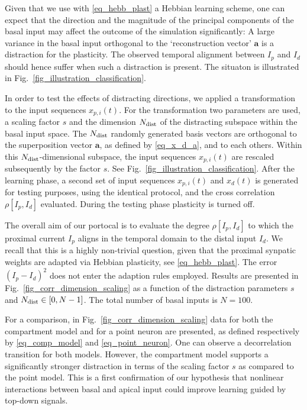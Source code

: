 \documentclass[utf8]{frontiersSCNS} %
\begin{document}
Given that we use with \eqref{eq_hebb_plast}
a Hebbian learning scheme, one can expect that
the direction and the magnitude of the principal 
components of the basal input may affect the
outcome of the simulation significantly:
A large variance in the basal input 
orthogonal to the `reconstruction vector' $\mathbf{a}$ 
is a distraction for the plasticity. The
observed temporal alignment between $I_p$ and 
$I_d$ should hence suffer when such a 
distraction is present. The situaton is illustrated 
in Fig.~\ref{fig_illustration_classification}.

In order to test the effects of distracting directions,
we applied a transformation to the input sequences $x_{p,i}(t)$.
For the transformation two parameters are used,
a scaling factor $s$ and the dimension $N_{\rm dist}$ 
of the distracting subspace within the basal input 
space. The $N_{\rm dist}$ randomly generated
basis vectors are orthogonal to the superposition
vector $\mathbf{a}$, as defined by \eqref{eq_x_d_a},
and to each others. Within this $N_{\rm dist}$-dimensional 
subspace, the input sequences $x_{p,i}(t)$ are
rescaled subsequently by the factor $s$. 
See Fig.~\ref{fig_illustration_classification}.
After the learning phase, a second set of input 
sequences $x_{p,i}(t)$ and $x_d(t)$ is generated for 
testing purposes, using the identical protocol, and
the cross correlation $\rho[I_p,I_d]$ 
evaluated. During the testing phase plasticity is 
turned off.

The overall aim of our portocal is to evaluate
the degree $\rho[I_p,I_d]$ to which
the proximal current $I_p$ aligns in the
temporal domain to the distal input $I_d$.
We recall that this is a highly non-trivial
question, given that the proximal synpatic
weights are adapted via Hebbian plasticity, 
see \eqref{eq_hebb_plast}. The error 
$(I_p-I_d)^2$ does not
enter the adaption rules employed.
Results are presented in
Fig.~\ref{fig_corr_dimension_scaling}
as a function of the distraction parameters 
$s$ and $N_{\rm dist}\in[0,N-1]$. The
total number of basal inputs is $N=100$.

For a comparison, in 
Fig.~\ref{fig_corr_dimension_scaling}
data for both the compartment model
and for a point neuron are presented,
as defined respectively by
\eqref{eq_comp_model}
and \eqref{eq_point_neuron}.
One can observe a decorrelation transition for 
both models. However, the compartment model supports a 
significantly stronger distraction in terms of the scaling 
factor $s$ as compared to the point model. This is a first confirmation 
of our hypothesis that nonlinear interactions between basal and 
apical input could improve learning guided by top-down signals.
\end{document}
